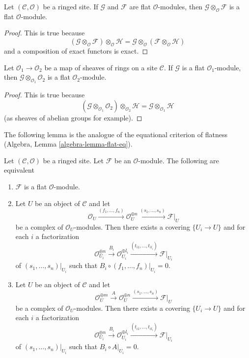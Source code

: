 \begin{lemma}
\label{lemma-tensor-flats}
Let $(\mathcal{C}, \mathcal{O})$ be a ringed site. If $\mathcal{G}$ and
$\mathcal{F}$ are flat $\mathcal{O}$-modules, then
$\mathcal{G} \otimes_\mathcal{O} \mathcal{F}$ is a flat $\mathcal{O}$-module.
\end{lemma}

\begin{proof}
This is true because
$$
(\mathcal{G} \otimes_\mathcal{O} \mathcal{F}) \otimes_\mathcal{O} \mathcal{H}
=
\mathcal{G} \otimes_\mathcal{O} (\mathcal{F} \otimes_\mathcal{O} \mathcal{H})
$$
and a composition of exact functors is exact.
\end{proof}

\begin{lemma}
\label{lemma-flat-change-of-rings}
Let $\mathcal{O}_1 \to \mathcal{O}_2$ be a map of sheaves
of rings on a site $\mathcal{C}$. If $\mathcal{G}$ is a
flat $\mathcal{O}_1$-module, then
$\mathcal{G} \otimes_{\mathcal{O}_1} \mathcal{O}_2$
is a flat $\mathcal{O}_2$-module.
\end{lemma}

\begin{proof}
This is true because
$$
(\mathcal{G} \otimes_{\mathcal{O}_1} \mathcal{O}_2)
\otimes_{\mathcal{O}_2} \mathcal{H}
=
\mathcal{G} \otimes_{\mathcal{O}_1} \mathcal{H}
$$
(as sheaves of abelian groups for example).
\end{proof}

\noindent
The following lemma is the analogue of the equational criterion of
flatness (Algebra, Lemma \ref{algebra-lemma-flat-eq}).

\begin{lemma}
\label{lemma-flat-eq}
Let $(\mathcal{C}, \mathcal{O})$ be a ringed site. Let $\mathcal{F}$ be an
$\mathcal{O}$-module. The following are equivalent
\begin{enumerate}
\item $\mathcal{F}$ is a flat $\mathcal{O}$-module.
\item Let $U$ be an object of $\mathcal{C}$ and let
$$
\mathcal{O}_U \xrightarrow{(f_1, \ldots, f_n)}
\mathcal{O}_U^{\oplus n} \xrightarrow{(s_1, \ldots, s_n)}
\mathcal{F}|_U
$$
be a complex of $\mathcal{O}_U$-modules. Then there exists a covering
$\{U_i \to U\}$ and for each $i$ a factorization
$$
\mathcal{O}_{U_i}^{\oplus n}
\xrightarrow{B_i}
\mathcal{O}_{U_i}^{\oplus l_i} \xrightarrow{(t_{i1}, \ldots, t_{il_i})}
\mathcal{F}|_{U_i}
$$
of $(s_1, \ldots, s_n)|_{U_i}$ such that
$B_i \circ (f_1, \ldots, f_n)|_{U_i} = 0$.
\item Let $U$ be an object of $\mathcal{C}$ and let
$$
\mathcal{O}_U^{\oplus m} \xrightarrow{A}
\mathcal{O}_U^{\oplus n} \xrightarrow{(s_1, \ldots, s_n)}
\mathcal{F}|_U
$$
be a complex of $\mathcal{O}_U$-modules. Then there exists a covering
$\{U_i \to U\}$ and for each $i$ a factorization
$$
\mathcal{O}_{U_i}^{\oplus n}
\xrightarrow{B_i}
\mathcal{O}_{U_i}^{\oplus l_i} \xrightarrow{(t_{i1}, \ldots, t_{il_i})}
\mathcal{F}|_{U_i}
$$
of $(s_1, \ldots, s_n)|_{U_i}$ such that
$B_i \circ A|_{U_i} = 0$.
\end{enumerate}
\end{lemma}

